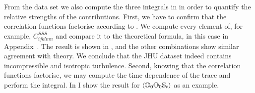 \documentclass[thesis.tex]{subfiles}
\begin{document}
From the data set we also compute the three integrals in  in order to quantify the relative strengths of the contributions. First, we have to confirm that the correlation functions factorise according to . We compute every element of, for example, $C^{SSS}_{ijklmn}$ and compare it to the theoretical formula, in this case  in Appendix~. The result is shown in , and the other combinations show similar agreement with theory. We conclude that the JHU dataset indeed contains incompressible and isotropic turbulence. Second, knowing that the correlation functions factorise, we may compute the time dependence of the trace and perform the integral. In  I show the result for $\langle \mathbb{O}_0 \mathbb{O}_0 \mathbb{S}_t\rangle$ as an example.
\end{document}
